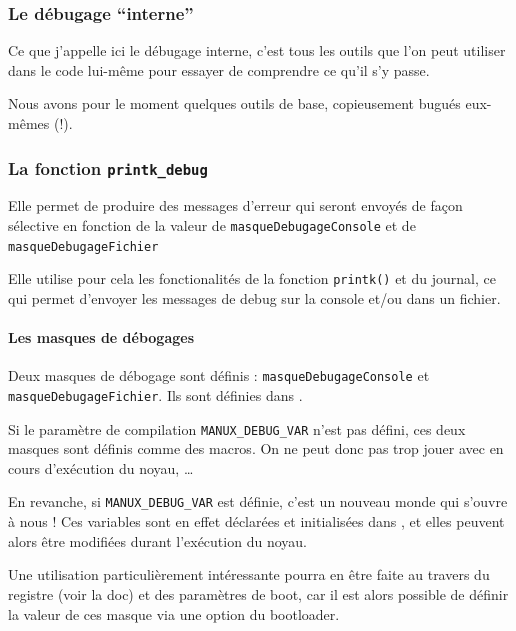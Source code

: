\subsubsection{Le débugage ``interne''}
\label{subsection:debugage_interne}

   Ce que j'appelle ici le débugage interne, c'est tous les outils que
l'on peut utiliser dans le code lui-même pour essayer de comprendre ce
qu'il s'y passe.

   Nous avons pour le moment quelques outils de base, copieusement bugués
eux-mêmes (!).

%
\subsubsection{La fonction {\tt printk\_debug}}

   Elle permet de produire des messages d'erreur qui seront envoyés de
façon sélective en fonction de la valeur de \lstinline!masqueDebugageConsole!
et de \lstinline!masqueDebugageFichier!

   Elle utilise pour cela les fonctionalités de la fonction
\lstinline!printk()! et du journal, ce qui permet d'envoyer les
messages de debug sur la console et/ou dans un fichier.

%
%
%
\paragraph{Les masques de débogages}

   Deux masques de débogage sont définis : \lstinline!masqueDebugageConsole! et
\lstinline!masqueDebugageFichier!. Ils sont définies dans
.

   Si le paramètre de compilation \lstinline!MANUX_DEBUG_VAR! n'est
pas défini, ces deux masques sont définis comme des macros. On ne peut
donc pas trop jouer avec en cours d'exécution du noyau, \ldots

   En revanche, si \lstinline!MANUX_DEBUG_VAR! est définie, c'est un
nouveau monde qui s'ouvre à nous ! Ces variables sont en effet
déclarées et initialisées dans , et elles
peuvent alors être modifiées durant l'exécution du noyau.

   Une utilisation particulièrement intéressante pourra en être faite
au travers du registre (voir la doc) et des paramètres de boot, car il
est alors possible de définir la valeur de ces masque via une option
du bootloader.

